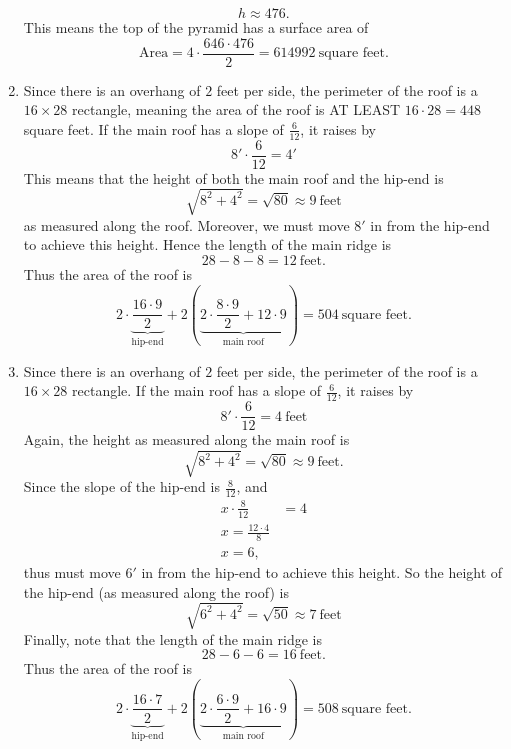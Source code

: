 \documentclass[hints,nooutcomes,noauthor,handout]{ximera}
\begin{document}
\begin{question}
\begin{freeResponse}
\begin{enumerate}
      \[
      h \approx 476.
      \]
      This means the top of the pyramid has a surface area of
      \[
      \text{Area} = 4\cdot \frac{646\cdot 476}{2} = 614992~\text{square feet}.
      \]
    \item Since there is an overhang of $2$ feet per side, the
      perimeter of the roof is a $16\times 28$ rectangle, meaning the
      area of the roof is AT LEAST $16\cdot 28 = 448$ square feet. If
      the main roof has a slope of $\frac{6}{12}$, it raises by
      \[
      8'\cdot \frac{6}{12}  = 4'
      \]
      This means that the height of both the main roof and the hip-end is
      \[
      \sqrt{8^2+4^2} = \sqrt{80} \approx 9~\text{feet}
      \]
      as measured along the roof. Moreover, we must move $8'$ in from
      the hip-end to achieve this height. Hence the length of the main
      ridge is
      \[
      28-8-8 = 12~\text{feet}.
      \]
      Thus the area of the roof is
      \[
      2\cdot \underbrace{\frac{16\cdot 9}{2}}_{\text{hip-end}} +
      2\left(\underbrace{2\cdot \frac{8\cdot 9}{2} + 12\cdot
        9}_{\text{main roof}}\right) = 504~\text{square feet}.
      \]
    \item Since there is an overhang of $2$ feet per side, the
      perimeter of the roof is a $16\times 28$ rectangle. If the main
      roof has a slope of $\frac{6}{12}$, it raises by
      \[
      8'\cdot \frac{6}{12}  = 4~\text{feet}
      \]
      Again, the height as measured along the main roof is
      \[
      \sqrt{8^2+4^2} = \sqrt{80}\approx 9~\text{feet}.
      \]
      Since the slope of the hip-end is $\frac{8}{12}$, and
      \begin{align*}
        x\cdot \frac{8}{12} &= 4\\
        x = \frac{12\cdot 4}{8}\\
        x = 6,
      \end{align*}
      thus must move $6'$ in from the hip-end to achieve this height.
      So the height of the hip-end (as measured along the roof) is
      \[
      \sqrt{6^2+4^2} = \sqrt{50} \approx 7~\text{feet}
      \]
      Finally, note that the length of the main ridge is
      \[
      28-6-6 = 16~\text{feet}.
      \]
      Thus the area of the roof is
      \[
      2\cdot \underbrace{\frac{16\cdot 7}{2}}_{\text{hip-end}} +
      2\left(\underbrace{2\cdot \frac{6\cdot 9}{2} + 16\cdot
        9}_{\text{main roof}}\right) = 508~\text{square feet}.
      \]
  \end{enumerate}
\end{freeResponse}


\end{question}
\mynewpage
\end{document}
